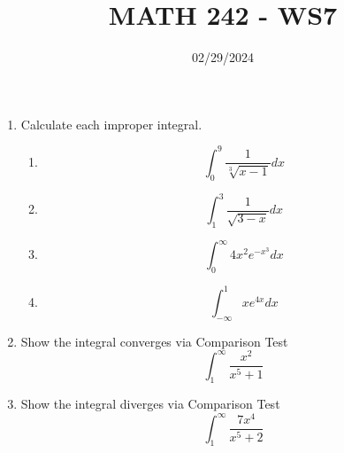 \documentclass[12pt]{article}
\title{MATH 242 - WS7}
\date{02/29/2024}
\begin{document}
\maketitle


\begin{enumerate}

\item Calculate each improper integral.
\begin{enumerate}
    \item $$\int_0^9\frac{1}{\sqrt[3]{x-1}}dx$$
    \newpage
    \item $$\int_1^3\frac{1}{\sqrt{3-x}}dx$$
    \vfill
    \item $$\int_{0}^{\infty}4x^2e^{-x^3}dx$$
    \vfill
    \newpage
    \item $$\int_{-\infty}^{1}xe^{4x}dx$$
   
\end{enumerate}
\newpage
\item Show the integral converges via Comparison Test
$$\int_1^{\infty}\frac{x^2}{x^5+1}$$
\vfill\item Show the integral diverges via Comparison Test
$$\int_1^{\infty}\frac{7x^4}{x^5+2}$$
\vfill

\end{enumerate}
\end{document}
